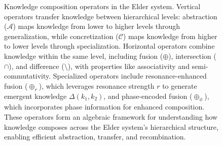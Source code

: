 \begin{figure}[t]
\caption{Knowledge composition operators in the Elder system. Vertical operators transfer knowledge between hierarchical levels: abstraction ($\mathcal{A}$) maps knowledge from lower to higher levels through generalization, while concretization ($\mathcal{C}$) maps knowledge from higher to lower levels through specialization. Horizontal operators combine knowledge within the same level, including fusion ($\oplus$), intersection ($\cap$), and difference ($\setminus$), with properties like associativity and semi-commutativity. Specialized operators include resonance-enhanced fusion ($\oplus_r$), which leverages resonance strength $r$ to generate emergent knowledge $\Delta(k_1, k_2)$, and phase-encoded fusion ($\oplus_\phi$), which incorporates phase information for enhanced composition. These operators form an algebraic framework for understanding how knowledge composes across the Elder system's hierarchical structure, enabling efficient abstraction, transfer, and recombination.}
\label{fig:composition_operators}
\end{figure}